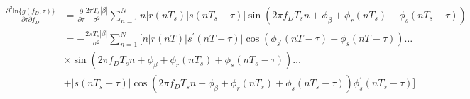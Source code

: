 \documentclass[12pt,a4paper,twoside,english]{article}
\begin{document}
\begin{align}
  \frac{\partial ^2 \textrm{ln}\{g(f_D,\tau)\} }{\partial   \tau \partial f_D}  & =  \frac{\partial }{\partial  \tau} \frac{2\pi T_s |\beta|}{\sigma ^2} \sum_{n=1}^{N} n|r(nT_s)|s(nT_s - \tau)|\sin{(2\pi f_DT_s n + \phi_{\beta} + \phi_r(nT_s) + \phi_{s}(nT_s - \tau))} \nonumber \\
                                                                                & = -\frac{2\pi T_s |\beta|}{\sigma ^2} \sum_{n=1}^{N}[ n|r(nT)|s^{\prime}(nT - \tau)|\cos{(\phi_{s^{\prime}}(nT - \tau) - \phi_{s}(nT - \tau))} \ldots \nonumber \\
                                                                                & \times \sin{(2\pi f_DT_s n + \phi_{\beta} + \phi_r(nT_s) + \phi_{s}(nT_s - \tau))}  \ldots \nonumber \\
                                                                                & + |s(nT_s - \tau)|\cos{(2\pi f_DT_s n + \phi_{\beta} + \phi_r(nT_s) + \phi_{s}(nT_s - \tau))}\phi^{\prime}_{s}(nT_s - \tau)]
\end{align}
\end{document}
